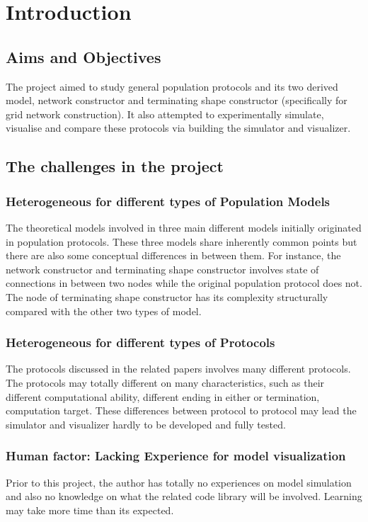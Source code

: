 \section{Introduction}
\subsection{Aims and Objectives}
The project aimed to study general population protocols \cite{AspnesR2007} and
 its two derived model,
network constructor \cite{MS16a} and terminating shape constructor \cite{Mi17}
(specifically for grid network construction).
It also attempted to experimentally simulate, visualise and compare these protocols
via building the simulator and visualizer.

\subsection{The challenges in the project}
\subsubsection{Heterogeneous for different types of Population Models}
The theoretical models involved in three main different models initially originated in
population protocols. These three models share inherently common points but there are also some
conceptual differences in between them. For instance, the network constructor \cite{MS16a} and terminating
shape constructor \cite{Mi17}
involves state of connections in between two nodes while the original population protocol does not.
The node of terminating shape constructor has its complexity structurally compared with
the other two types of model.

\subsubsection{Heterogeneous for different types of Protocols}
The protocols discussed in the related papers \cite{AspnesR2007, MS16a, Mi17} involves
many different protocols. The protocols may totally different on many characteristics,
such as their different computational ability, different ending in either or termination,
computation target. These differences between
protocol to protocol may lead the simulator and visualizer hardly to be developed and
fully tested.

\subsubsection{Human factor: Lacking Experience for model visualization}
Prior to this project, the author has totally no experiences on model simulation and
also no knowledge on what the related code library will be involved. Learning may take
more time than its expected.

